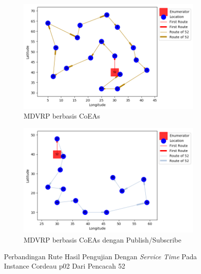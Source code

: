\begin{figure}[H]
	\centering
	\begin{subfigure}[t]{\textwidth}
		\centering
		\includegraphics[width=\textwidth]{Resources/Images/cordeau_p02_tw/cordeau_p02_tw_52_coes}
		\caption{MDVRP berbasis CoEAs}
		\label{fig:cordeau_p02_tw_52_coes}
	\end{subfigure}
	\begin{subfigure}[t]{\textwidth}
		\centering
		\includegraphics[width=\textwidth]{Resources/Images/cordeau_p02_tw/cordeau_p02_tw_52_pubsub_coes}
		\caption{MDVRP berbasis CoEAs dengan Publish/Subscribe}
		\label{fig:cordeau_p02_tw_52_pubsub_coes}
	\end{subfigure}
	\caption{Perbandingan Rute Hasil Pengujian Dengan \textit{Service Time} Pada Instance Cordeau p02 Dari Pencacah 52}
	\label{fig:cordeau_p02_tw_52}
\end{figure}


